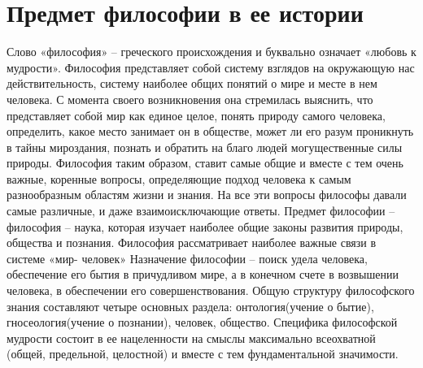 \documentclass[12pt]{article}
\begin{document}


\newpage
\section{Предмет философии в ее истории}
Слово  «философия»  –  греческого  происхождения  и  буквально  означает  «любовь  к  мудрости».  Философия
представляет собой систему взглядов на окружающую нас действительность, систему наиболее общих понятий
о мире и месте в нем человека. С момента своего возникновения она стремилась выяснить, что представляет
собой мир как единое целое, понять природу самого человека, определить, какое место занимает он в обществе,
может ли его разум проникнуть в тайны мироздания, познать и обратить на благо людей могущественные силы
природы. Философия таким образом, ставит самые общие и вместе с тем очень важные, коренные вопросы,
определяющие  подход  человека  к  самым  разнообразным  областям  жизни  и  знания.  На  все  эти  вопросы
философы давали самые различные, и даже взаимоисключающие ответы.
Предмет философии – философия – наука, которая изучает наиболее общие законы развития природы, общества
и познания. Философия рассматривает наиболее важные связи в системе «мир- человек»
Назначение философии – поиск удела человека, обеспечение его бытия в причудливом мире, а в конечном счете
в  возвышении  человека,  в  обеспечении  его  совершенствования.  Общую  структуру  философского  знания
составляют четыре основных раздела: онтология(учение о бытие), гносеология(учение о познании), человек,
общество.
Специфика философской мудрости состоит в ее нацеленности на смыслы максимально всеохватной (общей,
предельной, целостной) и вместе с тем фундаментальной значимости.


\newpage
\end{document}
